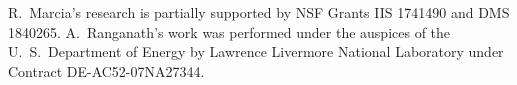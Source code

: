 R.\ Marcia's research is partially supported by NSF Grants IIS 1741490 and DMS 1840265.  A.\ Ranganath's work was performed under the auspices of the U.\ S.\ Department of Energy by Lawrence Livermore National Laboratory under Contract DE-AC52-07NA27344. 